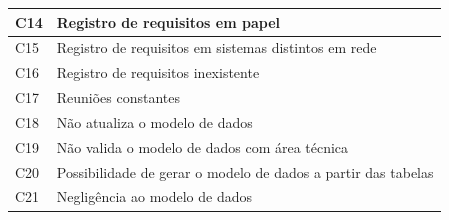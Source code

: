 \begin{longtable}{|M{1.3cm} | m{14.0cm}|}
C14            & Registro de requisitos em papel                                                                                                                                                                                                                                   \\ \hline
C15            & Registro de requisitos em sistemas distintos em rede                                                                                                                                                                                                              \\ \hline
C16            & Registro de requisitos inexistente                                                                                                                                                                                                                                \\ \hline
C17            & Reuniões constantes                                                                                                                                                                                                                                               \\ \hline
C18            & Não atualiza o modelo de dados                                                                                                                                                                                                                                    \\ \hline
C19            & Não valida o modelo de dados com área técnica                                                                                                                                                                                                                     \\ \hline
C20            & Possibilidade de gerar o modelo de dados a partir das tabelas                                                                                                                                                                                                     \\ \hline
C21            & Negligência ao modelo de dados                                                                                                                                                                                                                                    \\ \hline

\end{longtable}
